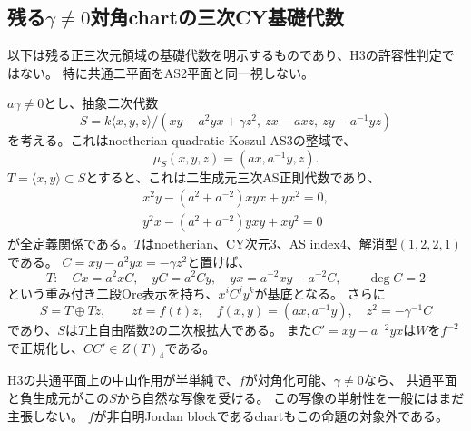 \subsection{残る$\gamma\ne0$対角chartの三次CY基礎代数}
\label{subsec:h3-positive3-nonzero-gamma-base}
以下は残る正三次元領域の基礎代数を明示するものであり、H3の許容性判定ではない。
特に共通二平面をAS2平面と同一視しない。

\begin{proposition}\label{prop:h3-positive3-nonzero-gamma-base}
$a\gamma\ne0$とし、抽象二次代数
\[
 S=k\langle x,y,z\rangle/
 (xy-a^2yx+\gamma z^2,\ zx-axz,\ zy-a^{-1}yz)
\]
を考える。これはnoetherian quadratic Koszul AS3の整域で、
\[
 \mu_S(x,y,z)=(ax,a^{-1}y,z).
\]
$T=\langle x,y\rangle\subset S$とすると、これは二生成元三次AS正則代数であり、
\begin{gather*}
 x^2y-(a^2+a^{-2})xyx+yx^2=0,\\
 y^2x-(a^2+a^{-2})yxy+xy^2=0
\end{gather*}
が全定義関係である。$T$はnoetherian、CY次元3、AS index4、解消型$(1,2,2,1)$である。
$C=xy-a^2yx=-\gamma z^2$と置けば、
\[
 T:\quad Cx=a^2xC,\quad yC=a^2Cy,\quad yx=a^{-2}xy-a^{-2}C,
 \qquad\deg C=2
\]
という重み付き二段Ore表示を持ち、$x^iC^jy^k$が基底となる。
さらに
\[
 S=T\oplus Tz,\qquad zt=f(t)z,\quad
 f(x,y)=(ax,a^{-1}y),\quad z^2=-\gamma^{-1}C
\]
であり、$S$は$T$上自由階数2の二次根拡大である。
また$C'=xy-a^{-2}yx$は$W$を$f^{-2}$で正規化し、$CC'\in Z(T)_4$である。

H3の共通平面上の中山作用が半単純で、$f$が対角化可能、$\gamma\ne0$なら、
共通平面と負生成元がこの$S$から自然な写像を受ける。
この写像の単射性を一般にはまだ主張しない。
$f$が非自明Jordan blockであるchartもこの命題の対象外である。
\end{proposition}
